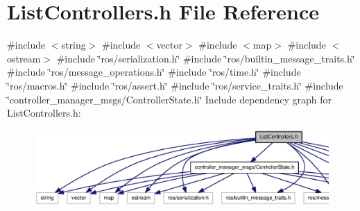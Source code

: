\section{\-List\-Controllers.\-h \-File \-Reference}
\label{ListControllers_8h}
{\ttfamily \#include $<$string$>$}\*
{\ttfamily \#include $<$vector$>$}\*
{\ttfamily \#include $<$map$>$}\*
{\ttfamily \#include $<$ostream$>$}\*
{\ttfamily \#include \char`\"{}ros/serialization.\-h\char`\"{}}\*
{\ttfamily \#include \char`\"{}ros/builtin\-\_\-message\-\_\-traits.\-h\char`\"{}}\*
{\ttfamily \#include \char`\"{}ros/message\-\_\-operations.\-h\char`\"{}}\*
{\ttfamily \#include \char`\"{}ros/time.\-h\char`\"{}}\*
{\ttfamily \#include \char`\"{}ros/macros.\-h\char`\"{}}\*
{\ttfamily \#include \char`\"{}ros/assert.\-h\char`\"{}}\*
{\ttfamily \#include \char`\"{}ros/service\-\_\-traits.\-h\char`\"{}}\*
{\ttfamily \#include \char`\"{}controller\-\_\-manager\-\_\-msgs/\-Controller\-State.\-h\char`\"{}}\*
\-Include dependency graph for \-List\-Controllers.\-h\-:
\nopagebreak
\begin{figure}[H]
\begin{center}
\leavevmode
\includegraphics[width=350pt]{ListControllers_8h__incl}
\end{center}
\end{figure}
